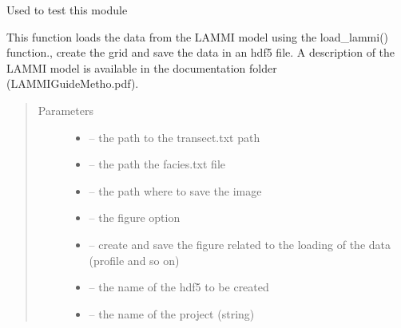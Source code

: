 \documentclass[letterpaper,10pt,english]{sphinxmanual}
\begin{document}
\begin{fulllineitems}
\label{\detokenize{index:src.lammi.main}}
Used to test this module

\end{fulllineitems}


\begin{fulllineitems}
\label{\detokenize{index:src.lammi.open_lammi_and_create_grid}}
This function loads the data from the LAMMI model using the load\_lammi() function., create the grid and save the
data in an hdf5 file. A description of the LAMMI model is available in the documentation folder
(LAMMIGuideMetho.pdf).
\begin{quote}\begin{description}
\item[{Parameters}] \leavevmode\begin{itemize}
\item {} 
 -- the path to the transect.txt path

\item {} 
 -- the path the facies.txt file

\item {} 
 -- the path where to save the image

\item {} 
 -- the figure option

\item {} 
 -- create and save the figure related to the loading of the data (profile and so on)

\item {} 
 -- the name of the hdf5 to be created

\item {} 
 -- the name of the project (string)


\end{itemize}
\end{description}
\end{quote}
\end{fulllineitems}
\end{document}
